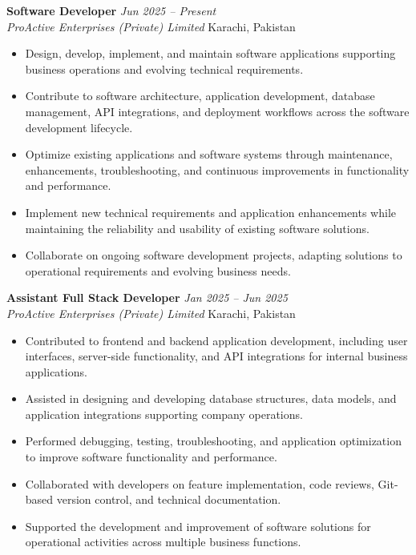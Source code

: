 \documentclass[11pt,a4paper]{article}
\newcommand{\entry}[4]{%
  \noindent\textbf{#1} \hfill \textit{#2}\\
  \textit{#3} \hfill #4\\[2pt]
}
\begin{document}
\entry{Software Developer}{Jun 2025 -- Present}
      {ProActive Enterprises (Private) Limited}
      {Karachi, Pakistan}
\begin{itemize}
    \item Design, develop, implement, and maintain software applications
          supporting business operations and evolving technical requirements.
    \item Contribute to software architecture, application development,
          database management, API integrations, and deployment workflows
          across the software development lifecycle.
    \item Optimize existing applications and software systems through
          maintenance, enhancements, troubleshooting, and continuous
          improvements in functionality and performance.
    \item Implement new technical requirements and application enhancements
          while maintaining the reliability and usability of existing
          software solutions.
    \item Collaborate on ongoing software development projects, adapting
          solutions to operational requirements and evolving business needs.
\end{itemize}

\vspace{4pt}
\entry{Assistant Full Stack Developer}{Jan 2025 -- Jun 2025}
      {ProActive Enterprises (Private) Limited}
      {Karachi, Pakistan}
\begin{itemize}
    \item Contributed to frontend and backend application development,
          including user interfaces, server-side functionality, and
          API integrations for internal business applications.
    \item Assisted in designing and developing database structures,
          data models, and application integrations supporting company
          operations.
    \item Performed debugging, testing, troubleshooting, and application
          optimization to improve software functionality and performance.
    \item Collaborated with developers on feature implementation,
          code reviews, Git-based version control, and technical
          documentation.
    \item Supported the development and improvement of software solutions
          for operational activities across multiple business functions.
\end{itemize}
\end{document}
